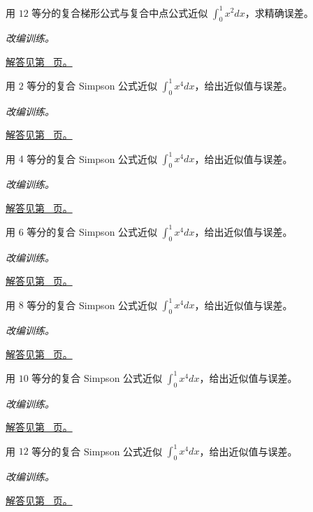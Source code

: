 \documentclass[12pt,fontset=fandol]{ctexart}
\begin{document}
\begin{example}[二次函数的梯形与中点公式]\label{ex:c18q6}
用 $12$ 等分的复合梯形公式与复合中点公式近似 $\int_0^1x^2dx$，求精确误差。
\par\textit{改编训练。}\par\hyperref[ans:c18q6]{解答见第~\pageref{ans:c18q6} 页。}
\end{example}
\begin{example}\label{ex:c18q7}
用 $2$ 等分的复合 Simpson 公式近似 $\int_0^1x^4dx$，给出近似值与误差。
\par\textit{改编训练。}\par\hyperref[ans:c18q7]{解答见第~\pageref{ans:c18q7} 页。}
\end{example}
\begin{example}\label{ex:c18q8}
用 $4$ 等分的复合 Simpson 公式近似 $\int_0^1x^4dx$，给出近似值与误差。
\par\textit{改编训练。}\par\hyperref[ans:c18q8]{解答见第~\pageref{ans:c18q8} 页。}
\end{example}
\begin{example}\label{ex:c18q9}
用 $6$ 等分的复合 Simpson 公式近似 $\int_0^1x^4dx$，给出近似值与误差。
\par\textit{改编训练。}\par\hyperref[ans:c18q9]{解答见第~\pageref{ans:c18q9} 页。}
\end{example}
\begin{example}\label{ex:c18q10}
用 $8$ 等分的复合 Simpson 公式近似 $\int_0^1x^4dx$，给出近似值与误差。
\par\textit{改编训练。}\par\hyperref[ans:c18q10]{解答见第~\pageref{ans:c18q10} 页。}
\end{example}
\begin{example}\label{ex:c18q11}
用 $10$ 等分的复合 Simpson 公式近似 $\int_0^1x^4dx$，给出近似值与误差。
\par\textit{改编训练。}\par\hyperref[ans:c18q11]{解答见第~\pageref{ans:c18q11} 页。}
\end{example}
\begin{example}\label{ex:c18q12}
用 $12$ 等分的复合 Simpson 公式近似 $\int_0^1x^4dx$，给出近似值与误差。
\par\textit{改编训练。}\par\hyperref[ans:c18q12]{解答见第~\pageref{ans:c18q12} 页。}
\end{example}
\end{document}
